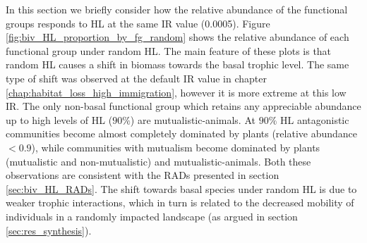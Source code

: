 In this section we briefly consider how the relative abundance of the functional groups responds to HL at the same IR value (0.0005). Figure \ref{fig:biv_HL_proportion_by_fg_random} shows the relative abundance of each functional group under random HL. The main feature of these plots is that random HL causes a shift in biomass towards the basal trophic level. The same type of shift was observed at the default IR value in chapter \ref{chap:habitat_loss_high_immigration}, however it is more extreme at this low IR. The only non-basal functional group which retains any appreciable abundance up to high levels of HL ($90\%$) are mutualistic-animals. At $90\%$ HL antagonistic communities become almost completely dominated by plants (relative abundance $<0.9$), while communities with mutualism become dominated by plants (mutualistic and non-mutualistic) and mutualistic-animals. Both these observations are consistent with the RADs presented in section \ref{sec:biv_HL_RADs}. The shift towards basal species under random HL is due to weaker trophic interactions, which in turn is related to the decreased mobility of individuals in a randomly impacted landscape (as argued in section \ref{sec:res_synthesis}). 

